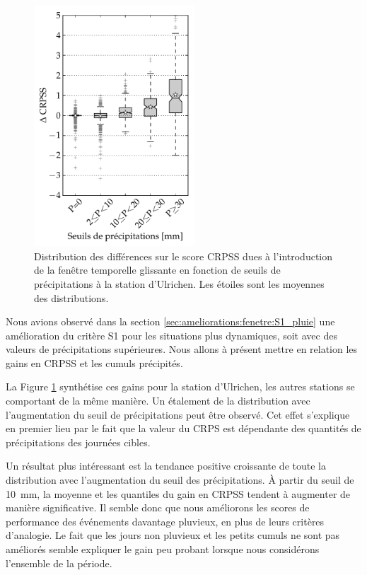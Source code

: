 \documentclass[hess]{copernicus}
\begin{document}
\begin{figure}[htb]
	\includegraphics[width=6cm]{figures/Graphique_fenetre_glissante_chmts_CRPS_seuils_precip.pdf}
	\caption{Distribution des différences sur le score CRPSS dues à l'introduction de la fenêtre temporelle glissante en fonction de seuils de précipitations à la station d'Ulrichen. Les étoiles sont les moyennes des distributions.}
	\label{fig:Graphique_fenetre_glissante_chmts_CRPS_seuils_precip}
\end{figure}

Nous avions observé dans la section \ref{sec:ameliorations:fenetre:S1_pluie} une amélioration du critère S1 pour les situations plus dynamiques, soit avec des valeurs de précipitations supérieures. Nous allons à présent mettre en relation les gains en CRPSS et les cumuls précipités.

La Figure \ref{fig:Graphique_fenetre_glissante_chmts_CRPS_seuils_precip} synthétise ces gains pour la station d'Ulrichen, les autres stations se comportant de la même manière. Un étalement de la distribution avec l'augmentation du seuil de précipitations peut être observé. Cet effet s'explique en premier lieu par le fait que la valeur du CRPS est dépendante des quantités de précipitations des journées cibles. 

Un résultat plus intéressant est la tendance positive croissante de toute la distribution avec l'augmentation du seuil des précipitations. À partir du seuil de 10~mm, la moyenne et les quantiles du gain en CRPSS tendent à augmenter de manière significative. Il semble donc que nous améliorons les scores de performance des événements davantage pluvieux, en plus de leurs critères d'analogie. Le fait que les jours non pluvieux et les petits cumuls ne sont pas améliorés semble expliquer le gain peu probant lorsque nous considérons l'ensemble de la période.
\end{document}
